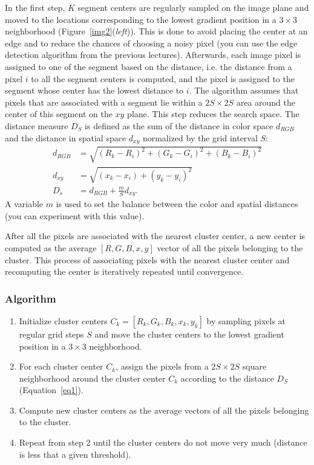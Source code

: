 \documentclass[12pt]{article}
\begin{document}
In the first step, $K$ segment centers are regularly sampled on the image plane and moved to the locations corresponding to the lowest gradient position in a $3 \times 3$ neighborhood (Figure~\ref{img2}(\textit{left})).
This is done to avoid placing the center at an edge and to reduce the chances of choosing a noisy pixel (you can use the edge detection algorithm from the previous lectures). 
Afterwards, each image pixel is assigned to one of the segment based on the distance, i.e. the distance from a pixel $i$ to all the segment centers is computed, and the pixel is assigned to the segment whose center has the lowest distance to $i$.
The algorithm assumes that pixels that are associated with a segment lie within a $2S \times 2S$ area around the center of this segment on the $xy$ plane.
This step reduces the search space.
The distance measure $D_S$ is defined as the sum of the distance in color space $d_{RGB}$ and the distance in spatial space $d_{xy}$ normalized by the grid interval $S$:
\begin{align}
d_{RGB} &= \sqrt{(R_k-R_i)^2+(G_k-G_i)^2+(B_k-B_i)^2} \\
d_{xy} &= \sqrt{(x_k-x_i)+(y_k-y_i)^2} \\
\label{eq1}
D_s &= d_{RGB} + \frac{m}{S} d_{xy}.
\end{align}
A variable $m$ is used to set the balance between the color and spatial distances (you can experiment with this value).

After all the pixels are associated with the nearest cluster center, a new center is computed as the average $[R, G, B, x, y]$ vector of all the pixels belonging to the cluster. 
This process of associating pixels with the nearest cluster center and recomputing the center is iteratively repeated until convergence.

\subsubsection*{Algorithm}

\begin{enumerate}
    \item Initialize cluster centers $C_k = [R_k, G_k, B_k, x_k, y_k]$ by sampling pixels at regular grid steps $S$ and move the cluster centers to the lowest gradient position in a $3\times 3$ neighborhood.
    \item For each cluster center $C_k$, assign the pixels from a $2S \times 2S$ square neighborhood around the cluster center $C_k$ according to the distance $D_S$ (Equation~\ref{eq1}).
    \item Compute new cluster centers as the average vectors of all the pixels belonging to the cluster.
    \item Repeat from step 2 until the cluster centers do not move very much (distance is less that a given threshold).
\end{enumerate}
\end{document}
